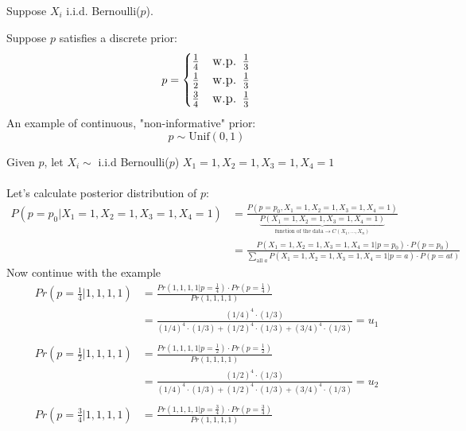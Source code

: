 \begin{example-N}
	Suppose $X_i$ i.i.d. Bernoulli($p$).\\
	\begin{multicols}{2}
		Suppose $p$ satisfies a discrete prior:
	\begin{gather*}
		p = \mathlarger{\begin{cases}
			\frac{1}{4} & \text{w.p. }\frac{1}{3}\\
			\frac{1}{2} & \text{w.p. }\frac{1}{3}\\
			\frac{3}{4} & \text{w.p. }\frac{1}{3}
		\end{cases}}
	\end{gather*}
	An example of continuous, "non-informative" prior:
	\begin{equation*}
		p \sim \text{Unif}(0,1)
	\end{equation*}
	\end{multicols}
	Given $p$, let $X_i \sim$ i.i.d Bernoulli($p$) \qquad $X_1 = 1, X_2 = 1, X_3 = 1, X_4 = 1$\\\\
	Let's calculate posterior distribution of $p$:
	\begin{align*}
		P( p = p_0| X_1 = 1, X_2 = 1, X_3 = 1, X_4 = 1)
		& = \frac{P( p = p_0, X_1 = 1, X_2 = 1, X_3 = 1, X_4 = 1)}{\underbrace{P(X_1 = 1, X_2 = 1, X_3 = 1, X_4 = 1)}_{\text{function of the data} \rightarrow C(X_1, \ldots, X_n)}}\\
		& = \frac{P(X_1 = 1, X_2 = 1, X_3 = 1, X_4 = 1 | p = p_0) \cdot P(p = p_0)}{\sum\limits_{\text{all }a} P(X_1 = 1, X_2 = 1, X_3 = 1, X_4 = 1 | p = a) \cdot P(p = at)} 
	\end{align*}
	Now continue with the example
	\begin{align*}
		Pr(p = \frac{1}{4} | 1,1,1,1)  & = \frac{Pr(1,1,1,1 | p = \frac{1}{4}) \cdot Pr(p = \frac{1}{4})}{Pr(1,1,1,1)}\\
		& = \frac{(1/4)^4 \cdot (1/3)}{(1/4)^4 \cdot (1/3) + (1/2)^4 \cdot (1/3) + (3/4)^4 \cdot (1/3)} = u_1\\\\
		Pr(p = \frac{1}{2} | 1,1,1,1)  & = \frac{Pr(1,1,1,1 | p = \frac{1}{2}) \cdot Pr(p = \frac{1}{2})}{Pr(1,1,1,1)}\\
		& = \frac{(1/2)^4 \cdot (1/3)}{(1/4)^4 \cdot (1/3) + (1/2)^4 \cdot (1/3) + (3/4)^4 \cdot (1/3)} = u_2\\\\
		Pr(p = \frac{3}{4} | 1,1,1,1)  & = \frac{Pr(1,1,1,1 | p = \frac{3}{4}) \cdot Pr(p = \frac{3}{4})}{Pr(1,1,1,1)}\\

\end{align*}
\end{example-N}
